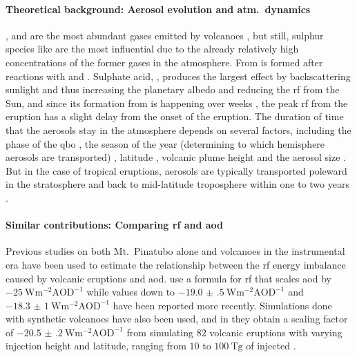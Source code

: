 \documentclass{ametsocV5}
\newcommand{\iso}[1][i]{{#1}njected \ce{SO2}}
\begin{document}
\paragraph*{Theoretical background: Aerosol evolution and atm.\ dynamics}

,  and  are the most abundant gases emitted by volcanoes
\citep{robock2000}, but still, sulphur species like  are the most influential
due to the already relatively high concentrations of the former gases in the atmosphere.
From   is formed after reactions with  and 
\citep{robock2000}. Sulphate acid, , produces the largest effect by
backscattering sunlight and thus increasing the planetary albedo and reducing the
\ac{rf} from the Sun, and since its formation from  is happening over weeks
\citep{robock2000}, the peak \ac{rf} from the eruption has a slight delay from the onset
of the eruption. The duration of time that the  aerosols stay in the
atmosphere depends on several factors, including the phase of the \ac{qbo}
\citep{pitari2016b}, the season of the year (determining to which hemisphere aerosols
are transported) \citep{toohey2011,toohey2019}, latitude \citep{marshall2019,
  toohey2019}, volcanic plume height \citep{marshall2019} and the aerosol size
\citep{marshall2019}. But in the case of tropical eruptions, aerosols are typically
transported poleward in the stratosphere and back to mid-latitude troposphere within one
to two years \citep{robock2000}.


\paragraph*{Similar contributions: Comparing \acs*{rf} and \acs*{aod}}

Previous studies on both Mt.\ Pinatubo alone \citep{mills2017,hansen2005} and volcanoes
in the instrumental era \citep{gregory2016} have been used to estimate the relationship
between the \ac{rf} energy imbalance caused by volcanic eruptions and \ac{aod}.
\citet{myhre2013} use a formula for \ac{rf} that scales \ac{aod} by
\(\SI{-25}{\watt\metre^{-2}\mathrm{AOD}^{-1}}\) while values down to
\(\SI{-19.0(5)}{\watt\metre^{-2}\mathrm{AOD}^{-1}}\) \citep{gregory2016} and
\(\SI{-18.3(10)}{\watt\metre^{-2}\mathrm{AOD}^{-1}}\) \citep{mills2017} have been
reported more recently. Simulations done with synthetic volcanoes have also been used,
and in \citet{marshall2020} they obtain a scaling factor of
\(\SI{-20.5(2)}{\watt\metre^{-2}\mathrm{AOD}^{-1}}\) from simulating \(82\) volcanic
eruptions with varying injection height and latitude, ranging from \(10\) to
\(\SI{100}{\tera\gram}\) of \iso{}.
\end{document}

